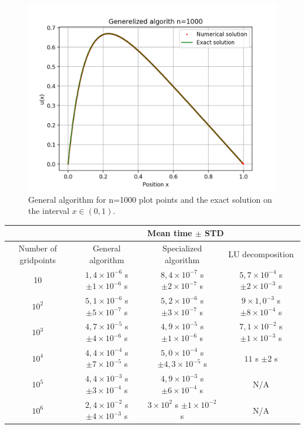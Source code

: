 \documentclass[10pt]{article}
\begin{document}
\begin{figure}[H]
  \center
  \includegraphics[scale=0.5]{alg-0-n1000plot.png}
  \caption{General algorithm for n=1000 plot points and the exact solution on the interval $x\in (0,1)$.}
\end{figure}


\begin{tabular}{||c|c|c|c||}
  \hline\hline 
    & \multicolumn{3}{|c||}{Mean time $\pm$ STD}\\
  \hline
  Number of gridpoints & General algorithm  & Specialized algorithm & LU decomposition \\
  \hline
  10 & $1,4\times 10^{-6}$ s $\pm 1\times 10^{-6}$ s& 
  $8,4\times 10^{-7}$ s $\pm 2 \times 10^{-7}$ s &  
  $5,7\times 10^{-4}$ s $\pm 2 \times 10^{-3}$ s \\
  \hline
  $10^2$ & $5,1\times 10^{-6}$ s $\pm 5 \times 10^{-7}$ s &
  $5,2\times 10^{-6}$ s $\pm 3 \times 10^{-7}$ s &
  $9\times 1,0^{-3}$ s $\pm 8 \times 10^{-4}$ s \\
  \hline
  $10^3$ & $4,7 \times 10^{-5}$ s $\pm 4 \times 10^{-6}$ s &
  $4,9\times 10^{-5}$ s $\pm 1 \times 10^{-6}$ s &
  $7,1\times 10^{-2}$ s $\pm 1\times 10^{-3}$ s \\
  \hline
  $10^4$ & $4,4 \times 10^{-4}$ s $\pm 7 \times 10^{-5}$ s &
  $5,0\times 10^{-4}$ s $\pm 4,3 \times 10^{-5}$ s &
  $11$ s $\pm 2$ s \\
  \hline 
  $10^5$ & $4,4 \times 10^{-3}$ s $\pm 3 \times 10^{-4}$ s&
  $4,9\times 10^{-3}$ s $\pm 6 \times 10^{-4}$ s & N/A\\
  \hline
  $10^6$ &$2,4 \times 10^{-2}$ s $\pm 4 \times 10^{-3}$ s &
  $3\times 10^{2}$ s $\pm 1 \times 10^{-2}$ s & N/A \\
  \hline\hline  
\end{tabular}
\end{document}
